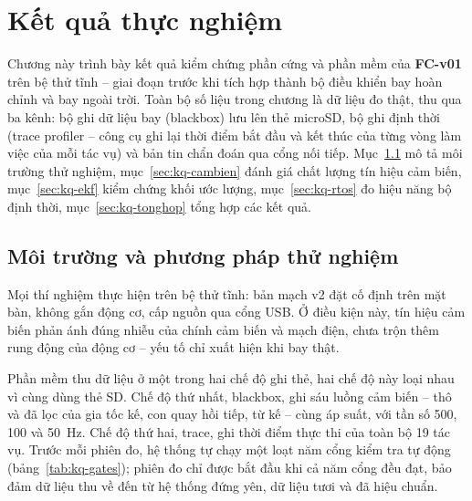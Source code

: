 \chapter{Kết quả thực nghiệm}

Chương này trình bày kết quả kiểm chứng phần cứng và phần mềm của \textbf{FC-v01} trên bệ thử tĩnh -- giai đoạn trước khi tích hợp thành bộ điều khiển bay hoàn chỉnh và bay ngoài trời. Toàn bộ số liệu trong chương là dữ liệu đo thật, thu qua ba kênh: bộ ghi dữ liệu bay (blackbox) lưu lên thẻ microSD, bộ ghi định thời (trace profiler -- công cụ ghi lại thời điểm bắt đầu và kết thúc của từng vòng làm việc của mỗi tác vụ) và bản tin chẩn đoán qua cổng nối tiếp. Mục~\ref{sec:kq-moitruong} mô tả môi trường thử nghiệm, mục~\ref{sec:kq-cambien} đánh giá chất lượng tín hiệu cảm biến, mục~\ref{sec:kq-ekf} kiểm chứng khối ước lượng, mục~\ref{sec:kq-rtos} đo hiệu năng bộ định thời, mục~\ref{sec:kq-tonghop} tổng hợp các kết quả.

\section{Môi trường và phương pháp thử nghiệm}\label{sec:kq-moitruong}

Mọi thí nghiệm thực hiện trên bệ thử tĩnh: bản mạch v2 đặt cố định trên mặt bàn, không gắn động cơ, cấp nguồn qua cổng USB. Ở điều kiện này, tín hiệu cảm biến phản ánh đúng nhiễu của chính cảm biến và mạch điện, chưa trộn thêm rung động của động cơ -- yếu tố chỉ xuất hiện khi bay thật.

Phần mềm thu dữ liệu ở một trong hai chế độ ghi thẻ, hai chế độ này loại nhau vì cùng dùng thẻ SD. Chế độ thứ nhất, blackbox, ghi sáu luồng cảm biến -- thô và đã lọc của gia tốc kế, con quay hồi tiếp, từ kế -- cùng áp suất, với tần số 500, 100 và 50~Hz. Chế độ thứ hai, trace, ghi thời điểm thực thi của toàn bộ 19 tác vụ. Trước mỗi phiên đo, hệ thống tự chạy một loạt năm cổng kiểm tra tự động (bảng~\ref{tab:kq-gates}); phiên đo chỉ được bắt đầu khi cả năm cổng đều đạt, bảo đảm dữ liệu thu về đến từ hệ thống đứng yên, dữ liệu tươi và đã hiệu chuẩn.

